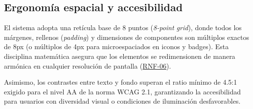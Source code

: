 \subsection{Ergonomía espacial y accesibilidad}

El sistema adopta una retícula base de 8 puntos (\emph{8-point grid}), donde todos los márgenes, rellenos (\emph{padding}) y dimensiones de componentes son múltiplos exactos de 8px (o múltiplos de 4px para microespaciados en iconos y badges). Esta disciplina matemática asegura que los elementos se redimensionen de manera armónica en cualquier resolución de pantalla (\hyperref[tab:requisitos-no-funcionales]{RNF-06}).

Asimismo, los contrastes entre texto y fondo superan el ratio mínimo de 4.5:1 exigido para el nivel AA de la norma WCAG 2.1, garantizando la accesibilidad para usuarios con diversidad visual o condiciones de iluminación desfavorables.

